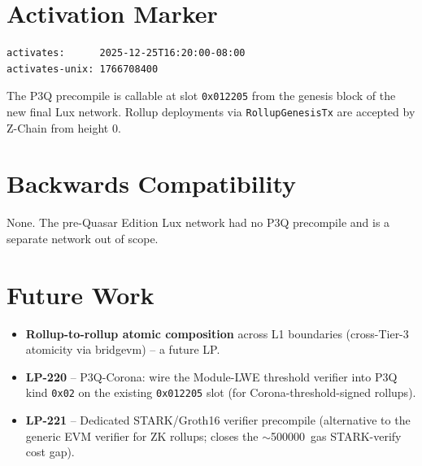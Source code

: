 \section{Activation Marker}

\begin{verbatim}
activates:      2025-12-25T16:20:00-08:00
activates-unix: 1766708400
\end{verbatim}

The P3Q precompile is callable at slot \texttt{0x012205} from the
genesis block of the new final Lux network. Rollup deployments via
\texttt{RollupGenesisTx} are accepted by Z-Chain from height 0.

\section{Backwards Compatibility}

None. The pre-Quasar Edition Lux network had no P3Q precompile and
is a separate network out of scope.

\section{Future Work}

\begin{itemize}[leftmargin=2em,nosep]
\item \textbf{Rollup-to-rollup atomic composition} across
  L1 boundaries (cross-Tier-3 atomicity via bridgevm) -- a future LP.
\item \textbf{LP-220} -- P3Q-Corona: wire the Module-LWE threshold
  verifier into P3Q kind \texttt{0x02} on the existing
  \texttt{0x012205} slot (for Corona-threshold-signed rollups).
\item \textbf{LP-221} -- Dedicated STARK/Groth16 verifier precompile
  (alternative to the generic EVM verifier for ZK rollups; closes
  the $\sim$\SI{500000}{gas} STARK-verify cost gap).
\end{itemize}
